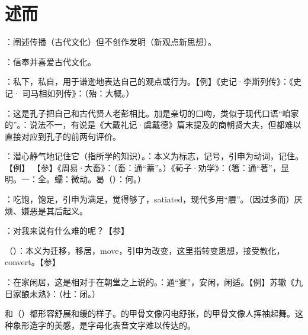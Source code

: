 \chapter{述而}

{
\item {}：阐述传播（古代文化）但不创作发明（新观点新思想）。
\item {}：信奉并喜爱古代文化。
\item {}：私下，私自，用于谦逊地表达自己的观点或行为。【例】《史记·李斯列传》：《史记· 司马相如列传》：（殆：大概。）
\item {}：这是孔子把自己和古代贤人老彭相比。加是亲切的口吻，类似于现代口语“咱家的”。：说法不一，有说是《大戴礼记·虞戴德》篇末提及的商朝贤大夫，但都难以直接对应到孔子的前两句评价。%
}
{}


{
\item {}：潜心静气地记住它（指所学的知识）。：本义为标志，记号，引申为动词，记住。【例】 【参】《周易·大畜》：（畜：通“蓄”。）《荀子·劝学》：（箸：通“著”，显明。一：全。蠕：微动。曷（）：何。）
\item {}：吃饱，饱足，引申为满足，觉得够了，satiated，现代多用“餍”。（因过多而）厌烦、嫌恶是其后起义。
\item {}：对我来说有什么难的呢？【参】 %
}
{}


{
\item {}（）：本义为迁移，移居，move，引申为改变，这里指转变思想，接受教化，convert。【参】
}
{}


{
\item {}：在家闲居，这是相对于在朝堂之上说的。：通“宴”，安闲，闲适。【例】苏辙《九日家酿未熟》：（杜：闭。） %
\item {}和（）都形容舒展和缓的样子。的甲骨文像闪电舒张，的甲骨文像人挥袖起舞。这种象形造字的美感，是字母化表音文字难以传达的。%
}
{}


